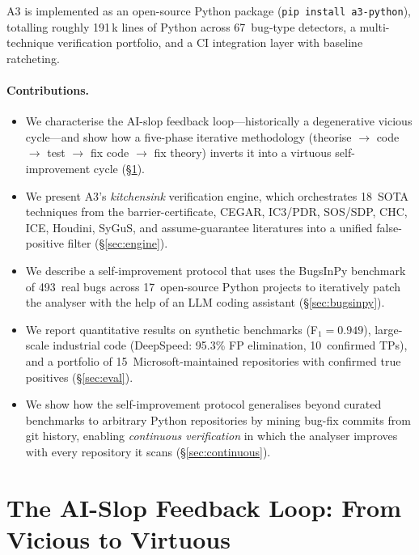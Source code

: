 \documentclass[sigconf,review,anonymous]{acmart}
\begin{document}
\textsc{A3} is implemented as an open-source Python package (\texttt{pip install a3-python}), totalling roughly 191\,k lines of Python across 67~bug-type detectors, a multi-technique verification portfolio, and a CI integration layer with baseline ratcheting.

\paragraph{Contributions.}
\begin{itemize}
  \item We characterise the AI-slop feedback loop---historically a degenerative vicious cycle---and show how a five-phase iterative methodology (theorise $\to$ code $\to$ test $\to$ fix code $\to$ fix theory) inverts it into a virtuous self-improvement cycle (\S\ref{sec:loop}).
  \item We present \textsc{A3}'s \emph{kitchensink} verification engine, which orchestrates 18~SOTA techniques from the barrier-certificate, CEGAR, IC3/PDR, SOS/SDP, CHC, ICE, Houdini, SyGuS, and assume-guarantee literatures into a unified false-positive filter (\S\ref{sec:engine}).
  \item We describe a self-improvement protocol that uses the BugsInPy benchmark~\cite{widyasari2020bugsinpy} of 493~real bugs across 17~open-source Python projects to iteratively patch the analyser with the help of an LLM coding assistant (\S\ref{sec:bugsinpy}).
  \item We report quantitative results on synthetic benchmarks (F$_1 = 0.949$), large-scale industrial code (DeepSpeed: 95.3\% FP elimination, 10~confirmed TPs), and a portfolio of 15~Microsoft-maintained repositories with confirmed true positives (\S\ref{sec:eval}).
  \item We show how the self-improvement protocol generalises beyond curated benchmarks to arbitrary Python repositories by mining bug-fix commits from git history, enabling \emph{continuous verification} in which the analyser improves with every repository it scans (\S\ref{sec:continuous}).
\end{itemize}

\section{The AI-Slop Feedback Loop: From Vicious to Virtuous}\label{sec:loop}
\end{document}
